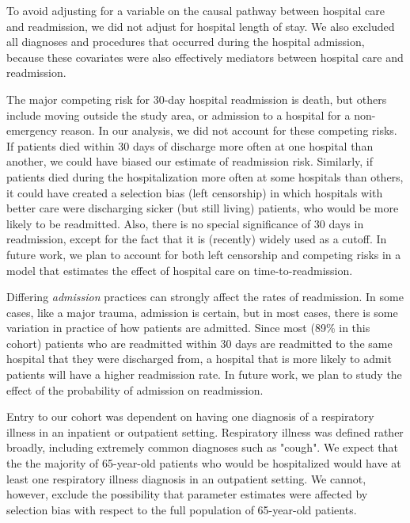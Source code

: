 \documentclass[]{article}\usepackage[]{graphicx}\usepackage[]{color}
\begin{document}
To avoid adjusting for a variable on the causal pathway between hospital care and readmission, we did not adjust for hospital length of stay.\supercite{ash_statistical_2012} We also excluded all diagnoses and procedures that occurred during the hospital admission, because these covariates were also effectively mediators between hospital care and readmission.

The major competing risk for 30-day hospital readmission is death, but others include moving outside the study area, or admission to a hospital for a non-emergency reason. In our analysis, we did not account for these competing risks. If patients died within 30 days of discharge more often at one hospital than another, we could have biased our estimate of readmission risk. Similarly, if patients died during the hospitalization more often at some hospitals than others, it could have created a selection bias (left censorship) in which hospitals with better care were discharging sicker (but still living) patients, who would be more likely to be readmitted. Also, there is no special significance of 30 days in readmission, except for the fact that it is (recently) widely used as a cutoff. In future work, we plan to account for both left censorship and competing risks in a model that estimates the effect of hospital care on time-to-readmission.

Differing \emph{admission} practices can strongly affect the rates of readmission.\supercite{epstein_relationship_2011} In some cases, like a major trauma, admission is certain, but in most cases, there is some variation in practice of how patients are admitted. Since most  (89\% in this cohort) patients who are readmitted within 30 days are readmitted to the same hospital that they were discharged from, a hospital that is more likely to admit patients will have a higher readmission rate. In future work, we plan to study the effect of the probability of admission on readmission.

Entry to our cohort was dependent on having one diagnosis of a respiratory illness in an inpatient or outpatient setting. Respiratory illness was defined rather broadly, including extremely common diagnoses such as "cough". We expect that the the majority of 65-year-old patients who would be hospitalized would have at least one respiratory illness diagnosis in an outpatient setting. We cannot, however, exclude the possibility that parameter estimates were affected by selection bias with respect to the full population of 65-year-old patients.
\end{document}
